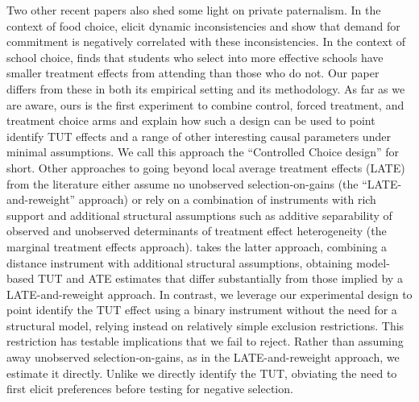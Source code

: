 \documentclass[oneside,11pt]{article}
\begin{document}
Two other recent papers also shed some light on private paternalism. In the context of food choice, \cite{Sprenger} elicit dynamic inconsistencies and show that demand for commitment is negatively correlated with these inconsistencies. In the context of school choice, \cite{Walters} finds that students who select into more effective schools have smaller treatment effects from attending than those who do not.
Our paper differs from these in both its empirical setting and its methodology.
As far as we are aware, ours is the first experiment to combine control, forced treatment, and treatment choice arms and explain how such a design can be used to point identify TUT effects and a range of other interesting causal parameters under minimal assumptions.
We call this approach the ``Controlled Choice design'' for short.
Other approaches to going beyond local average treatment effects (LATE) from the literature either assume no unobserved selection-on-gains \citep{aronow2013beyond,angrist2013extrapolate} (the ``LATE-and-reweight'' approach) or rely on a combination of instruments with rich support and additional structural assumptions such as additive separability of observed and unobserved determinants of treatment effect heterogeneity \citep{heckman2007econometric, cornelissen2018benefits} (the marginal treatment effects approach).
\cite{Walters} takes the latter approach, combining a distance instrument with additional structural assumptions, obtaining model-based TUT and ATE estimates that differ substantially from those implied by a LATE-and-reweight approach. 
In contrast, we leverage our experimental design to point identify the TUT effect using a binary instrument without the need for a structural model, relying instead on relatively simple exclusion restrictions. This restriction has testable implications that we fail to reject. Rather than assuming away unobserved selection-on-gains, as in the LATE-and-reweight approach, we estimate it directly.
Unlike \cite{Sprenger} we directly identify the TUT, obviating the need to first elicit preferences before testing for negative selection.


\end{document}
